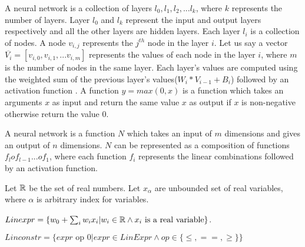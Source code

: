 A neural network is a collection of layers $l_0, l_1, l_2, ... l_k$, where $k$ represents the number of layers. 
Layer $l_0$ and $l_k$ represent the input and output layers respectively and all the other layers are hidden layers.
Each layer $l_i$ is a collection of nodes. A node $v_{i,j}$ represents the $j^{th}$ node in the layer $i$. 
Let us say a vector $\overline{V_i} = [v_{i,0}, v_{i,1}, ... v_{i,m}]$ represents the values of each node in the layer $i$, where $m$ is the number of nodes in the same layer. 
Each layer's values are computed using the weighted sum of the previous layer's values($W_i * V_{i-1} + B_i$) followed by an activation function
\relu{}. A function $y = max(0,x)$ is a \relu{} function which takes an arguments $x$ as input and return the same value $x$ as output if 
$x$ is non-negative otherwise return the value 0. 

A neural network is a function $N$ which takes an input of $m$ dimensions and gives an output of $n$ dimensions.
$N$ can be represented as a composition of functions $f_l o f_{l-1} ... o f_1$, where each function $f_i$ represents the linear combinations followed by an activation function. 

Let $\mathbb{R}$ be the set of real numbers.
Let $x_{\alpha}$ are unbounded set of real variables, where
$\alpha$ is arbitrary index for variables.


\begin{df}
  $Linexpr = \{ w_0 + \sum_{i} w_i x_i | w_i \in \mathbb{R} \land x_i \text{ is a real variable} \}$.
\end{df}

\begin{df}
  $Linconstr = \{expr \text{ op } 0 | expr \in LinExpr \land op \in \{\leq, ==, \geq\}\}$
\end{df}

